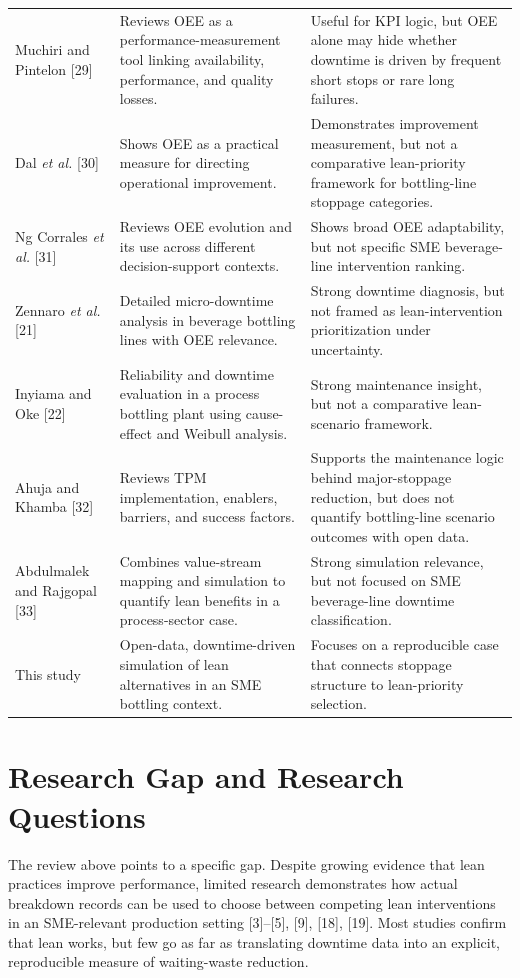 \documentclass[12pt,a4paper]{article}
\begin{document}
\begin{longtable}{p{2.8cm}p{5.7cm}p{4.9cm}}
Muchiri and Pintelon [29] & Reviews OEE as a performance-measurement tool linking availability, performance, and quality losses. & Useful for KPI logic, but OEE alone may hide whether downtime is driven by frequent short stops or rare long failures. \\
Dal \emph{et al.} [30] & Shows OEE as a practical measure for directing operational improvement. & Demonstrates improvement measurement, but not a comparative lean-priority framework for bottling-line stoppage categories. \\
Ng Corrales \emph{et al.} [31] & Reviews OEE evolution and its use across different decision-support contexts. & Shows broad OEE adaptability, but not specific SME beverage-line intervention ranking. \\
Zennaro \emph{et al.} [21] & Detailed micro-downtime analysis in beverage bottling lines with OEE relevance. & Strong downtime diagnosis, but not framed as lean-intervention prioritization under uncertainty. \\
Inyiama and Oke [22] & Reliability and downtime evaluation in a process bottling plant using cause-effect and Weibull analysis. & Strong maintenance insight, but not a comparative lean-scenario framework. \\
Ahuja and Khamba [32] & Reviews TPM implementation, enablers, barriers, and success factors. & Supports the maintenance logic behind major-stoppage reduction, but does not quantify bottling-line scenario outcomes with open data. \\
Abdulmalek and Rajgopal [33] & Combines value-stream mapping and simulation to quantify lean benefits in a process-sector case. & Strong simulation relevance, but not focused on SME beverage-line downtime classification. \\
This study & Open-data, downtime-driven simulation of lean alternatives in an SME bottling context. & Focuses on a reproducible case that connects stoppage structure to lean-priority selection. \\
\bottomrule
\end{longtable}

\section{Research Gap and Research Questions}
The review above points to a specific gap. Despite growing evidence that lean practices improve performance, limited research demonstrates how actual breakdown records can be used to choose between competing lean interventions in an SME-relevant production setting [3]--[5], [9], [18], [19]. Most studies confirm that lean works, but few go as far as translating downtime data into an explicit, reproducible measure of waiting-waste reduction.
\end{document}
